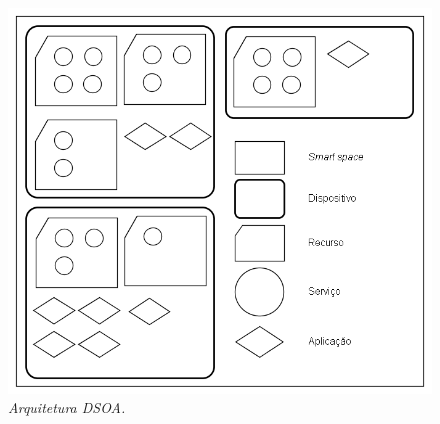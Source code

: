 	\begin{figure}[h]
		\centering \includegraphics[scale=.5]{figuras/cap3/arquiteturaDSOA.png}
		\caption{\textit{Arquitetura DSOA.}}
		\label{fig:arquiteturaDSOA} 
	\end{figure}

		